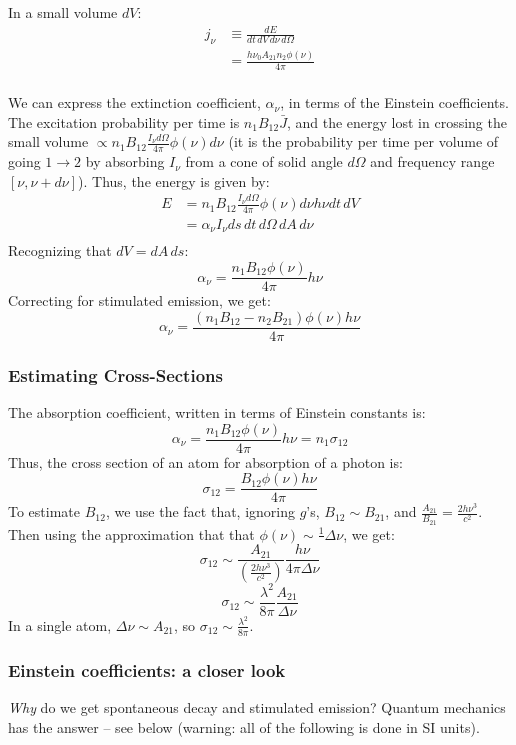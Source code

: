 \documentclass{article}
\def\sigot{\sigma_{12}}
\def\ato{{A_{21}}}
\def\bto{{B_{21}}}
\def\bot{{B_{12}}}
\def\inv#1{\frac1{#1}}
\def\Jbar{{\bar J}}
\def\inv#1{{\frac{1}{}#1}}
\def\sigot{\sigma_{12}}
\def\ato{{A_{21}}}
\def\bto{{B_{21}}}
\def\bot{{B_{12}}}
\def\ato{{A_{21}}}
\def\bto{{B_{21}}}
\def\bot{{B_{12}}}
\begin{document}
In a small volume $dV$:
$$\begin{aligned}j_\nu&\equiv\frac{dE}{ dt\,dV\,d\nu\,d\Omega}\\ 
&=\frac{h\nu_0\ato n_2\phi(\nu)}{4\pi}\\ \end{aligned}$$

We can express the extinction coefficient, $\alpha_\nu$, in terms of the Einstein coefficients.  The
excitation probability per time is $n_1B_{12}\Jbar$, and
the energy lost in crossing the small volume 
$\propto n_1\bot\frac{I_\nu d\Omega}{4\pi}\phi(\nu)d\nu$
(it is the probability per time per volume of going $1\to2$ by absorbing 
$I_\nu$ from
a cone of solid angle $d\Omega$ and frequency range $[\nu,\nu+d\nu]$). Thus,
the energy is given by:
$$\begin{aligned}E&=n_1\bot\frac{I_\nu d\Omega}{4\pi}\phi(\nu)d\nu h\nu dt\,dV\\ 
&=\alpha_\nu I_\nu ds\,dt\,d\Omega\,dA\,d\nu\\ \end{aligned}$$ 
Recognizing that $dV=dA\,ds$:
$$\alpha_\nu=\frac{n_1\bot\phi(\nu)}{4\pi}h\nu$$
Correcting for stimulated emission, we get:
$$\boxed{\alpha_\nu=\frac{(n_1\bot-n_2\bto)\phi(\nu)h\nu}{4\pi}}$$

\subsubsection{ Estimating Cross-Sections }

The absorption coefficient, written in terms of Einstein constants is:
$$\alpha_\nu=\frac{n_1\bot\phi(\nu)}{4\pi}h\nu=n_1\sigot$$
Thus, the cross section of an atom for absorption of a photon is:
$$\sigot=\frac{\bot\phi(\nu)h\nu}{4\pi}$$
To estimate $\bot$, we use the fact that, ignoring $g$'s, $\bot\sim\bto$,
and $\frac{\ato}{\bto}=\frac{2h\nu^3}{ c^2}$.  Then using the approximation that
that $\phi(\nu)\sim\inv{\Delta\nu}$, we get:
$$\sigot\sim\frac{\ato}{\left(\frac{2h\nu^3}{ c^2}\right)}
\frac{h\nu}{4\pi\Delta\nu}$$
$$\boxed{\sigot\sim\frac{\lambda^2}{8\pi}\frac{\ato}{\Delta\nu}}$$
In a single atom, $\Delta\nu\sim\ato$, so $\sigot\sim\frac{\lambda^2}{8\pi}$.


\subsubsection{Einstein coefficients: a closer look}
\textit{Why} do we get spontaneous decay and stimulated emission? Quantum mechanics has the answer -- see below (warning: all of the following is done in SI units).
\end{document}
